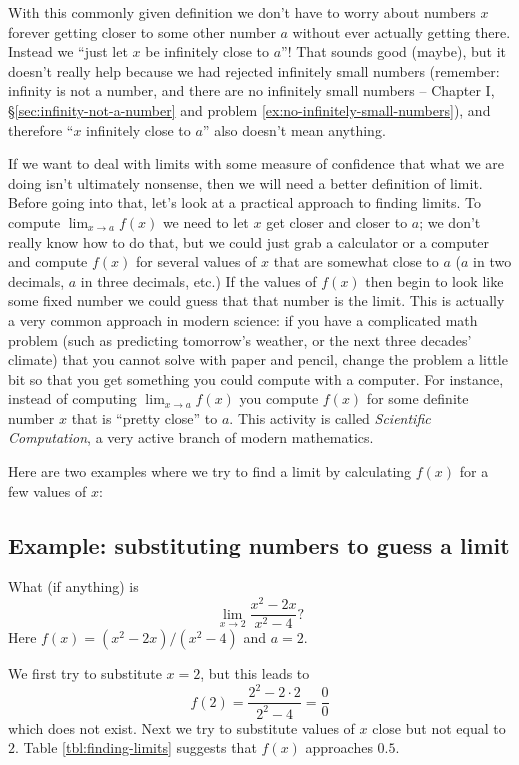 With this commonly given definition we don't have to worry about
numbers $x$ forever getting closer to some other number $a$ without
ever actually getting there.  Instead we ``just let $x$ be infinitely
close to $a$''!  That sounds good (maybe), but it doesn't really help
because we had rejected infinitely small numbers (remember: infinity
is not a number, and there are no infinitely small numbers --
Chapter I, \S\ref{sec:infinity-not-a-number} and problem
\ref{ex:no-infinitely-small-numbers}), and therefore ``$x$ infinitely
close to $a$'' also doesn't mean anything.


If we want to deal with limits with some measure of confidence that what we are
doing isn't ultimately nonsense, then we will need a better definition of limit.
Before going into that, let's look at a practical approach to finding limits.
To compute $\lim_{x\to a} f(x)$ we need to let $x$ get closer and closer to $a$;
we don't really know how to do that, but we could just grab a calculator or a
computer and compute $f(x)$ for several values of $x$ that are somewhat close to
$a$ ($a$ in two decimals, $a$ in three decimals, etc.)  If the values of $f(x)$
then begin to look like some fixed number we could guess that that number is the
limit.  This is actually a very common approach in modern science: if you have a
complicated math problem (such as predicting tomorrow's weather, or the next
three decades' climate) that you cannot solve with paper and pencil, change the
problem a little bit so that you get something you could compute with a
computer.  For instance, instead of computing $\lim_{x\to a}f(x)$ you compute
$f(x)$ for some definite number $x$ that is ``pretty close'' to $a$.  This
activity is called \emph{Scientific Computation}, a very active branch of modern
mathematics. 

Here are two examples where we try to find a limit by calculating
$f(x)$ for a few values of $x$:

\subsection{Example: substituting numbers to guess a limit}
\label{ex:limit-by-sub-good}
What (if anything) is
\[
\lim_{x\to 2}\frac{x^2 -2x}{x^2-4}?
\]
Here $f(x) = (x^2 - 2x)/(x^2-4)$ and $a=2$.


We first try to substitute $x=2$, but this leads to
\[
f(2) = \frac{2^2 - 2\cdot2}{2^2-4} = \frac 00
\]
which does not exist.  Next we try to substitute values of $x$ close but
not equal to $2$.  Table \ref{tbl:finding-limits} suggests that $f(x)$
approaches $0.5$.


